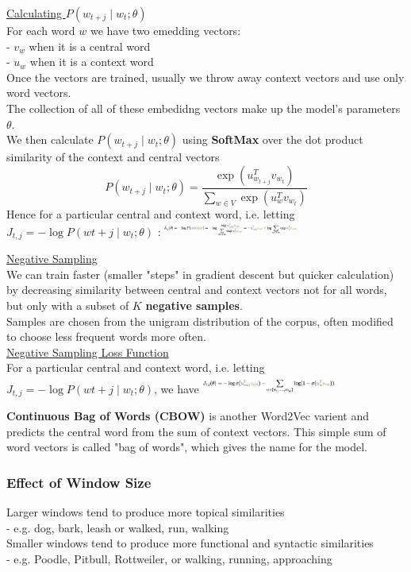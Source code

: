 \documentclass[8pt]{extarticle} %
\begin{document}
\begin{multicols*}{3}
\underline{Calculating $P(w_{t+j}\mid w_t;\theta)$}\\
For each word $w$ we have two emedding vectors:\\
- $v_w$ when it is a central word\\
- $u_w$ when it is a context word\\
Once the vectors are trained, usually we throw away context vectors and use only word vectors.\\
The collection of all of these embedidng vectors make up the model's parameters $\theta$.\\

We then calculate $P(w_{t+j}\mid w_t;\theta)$ using \textbf{SoftMax} over the dot product similarity of the context and central vectors
$$P(w_{t+j}\mid w_t;\theta)=\frac{\exp(u_{w_{t+j}}^T v_{w_t})}{\sum_{w \in V}\exp(u_w^T v_{w_t})}$$
Hence for a particular central and context word, i.e. letting $J_{t,j} = -\log P(w{t+j}\mid w_t;\theta)$ :
\includegraphics[width=0.33\textwidth]{media/loss-word-context.png}

\underline{Negative Sampling}\\
We can train faster (smaller "steps" in gradient descent but quicker calculation) by decreasing similarity between central 
and context vectors not for all words, but only with a subset of $K$ \textbf{negative samples}.\\

Samples are chosen from the unigram distribution of the corpus, often modified to choose less frequent words more often. \\

\underline{Negative Sampling Loss Function}\\
For a particular central and context word, i.e. letting $J_{t,j} = -\log P(w{t+j}\mid w_t;\theta)$, we have
\includegraphics[width=0.33\textwidth]{media/negative-sampling-loss.png}

\textbf{Continuous Bag of Words (CBOW)} is another Word2Vec varient and predicts the central word from the sum of context vectors. This simple sum of word vectors is called "bag of words", which gives the name for the model.

\subsubsection*{Effect of Window Size}
Larger windows tend to produce more topical similarities \\
- e.g. dog, bark, leash or walked, run, walking\\
Smaller windows tend to produce more functional and syntactic similarities \\
- e.g. Poodle, Pitbull, Rottweiler, or walking, running, approaching\\



\end{multicols*}
\end{document}
